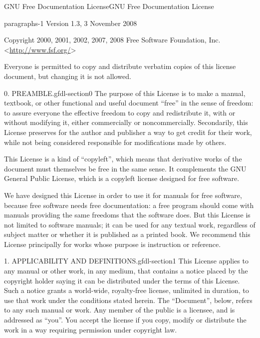 \documentclass[10pt,]{book}
\numberwithin{equation}{section}
\begin{document}
\begin{appendixptx}{GNU Free Documentation License}{}{GNU Free Documentation License}{}{}\label{appendix-gfdl}
\begin{paragraphs}{}{paragraphs-1}%
\hypertarget{p-518}{}%
Version 1.3, 3 November 2008%
\par
\hypertarget{p-519}{}%
Copyright \textcopyright{} 2000, 2001, 2002, 2007, 2008 Free Software Foundation, Inc. \textless{}\url{http://www.fsf.org/}\textgreater{}%
\par
\hypertarget{p-520}{}%
Everyone is permitted to copy and distribute verbatim copies of this license document, but changing it is not allowed.%
\end{paragraphs}%
\begin{paragraphs}{0. PREAMBLE.}{gfdl-section0}%
\hypertarget{p-521}{}%
The purpose of this License is to make a manual, textbook, or other functional and useful document ``free'' in the sense of freedom: to assure everyone the effective freedom to copy and redistribute it, with or without modifying it, either commercially or noncommercially. Secondarily, this License preserves for the author and publisher a way to get credit for their work, while not being considered responsible for modifications made by others.%
\par
\hypertarget{p-522}{}%
This License is a kind of ``copyleft'', which means that derivative works of the document must themselves be free in the same sense. It complements the GNU General Public License, which is a copyleft license designed for free software.%
\par
\hypertarget{p-523}{}%
We have designed this License in order to use it for manuals for free software, because free software needs free documentation: a free program should come with manuals providing the same freedoms that the software does. But this License is not limited to software manuals; it can be used for any textual work, regardless of subject matter or whether it is published as a printed book. We recommend this License principally for works whose purpose is instruction or reference.%
\end{paragraphs}%
\begin{paragraphs}{1. APPLICABILITY AND DEFINITIONS.}{gfdl-section1}%
\hypertarget{p-524}{}%
This License applies to any manual or other work, in any medium, that contains a notice placed by the copyright holder saying it can be distributed under the terms of this License. Such a notice grants a world-wide, royalty-free license, unlimited in duration, to use that work under the conditions stated herein. The ``Document'', below, refers to any such manual or work. Any member of the public is a licensee, and is addressed as ``you''. You accept the license if you copy, modify or distribute the work in a way requiring permission under copyright law.%

\end{paragraphs}
\end{appendixptx}
\end{document}
